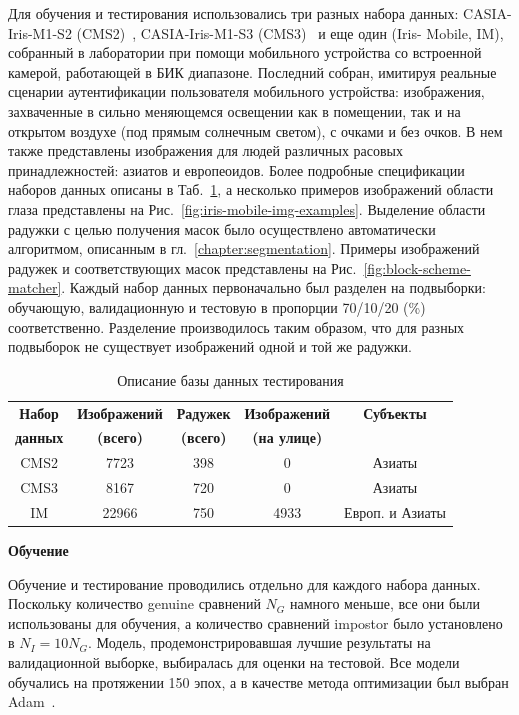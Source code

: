 Для обучения и тестирования использовались три разных набора данных: CASIA-Iris-M1-S2 (CMS2)~\cite{casia_mobile_v1}, CASIA-Iris-M1-S3 (CMS3)~\cite{casia_mobile_v1} и еще один (Iris- Mobile, IM), собранный в лаборатории при помощи мобильного устройства со встроенной камерой, работающей в БИК диапазоне. Последний собран, имитируя реальные сценарии аутентификации пользователя мобильного устройства: изображения, захваченные в сильно меняющемся освещении как в помещении, так и на открытом воздухе (под прямым солнечным светом), с очками и без очков. В нем также представлены изображения для людей различных расовых принадлежностей: азиатов и европеоидов. Более подробные спецификации наборов данных описаны в Таб.~\ref{tab:db-description-matcher}, а несколько примеров изображений области глаза представлены на Рис.~\ref{fig:iris-mobile-img-examples}. Выделение области радужки с целью получения масок было осуществлено автоматически алгоритмом, описанным в гл.~\ref{chapter:segmentation}. Примеры изображений радужек и соответствующих масок представлены на Рис.~\ref{fig:block-scheme-matcher}. Каждый набор данных первоначально был разделен на подвыборки: обучающую, валидационную и тестовую в пропорции 70/10/20 (\%) соответственно. Разделение производилось таким образом, что для разных подвыборок не существует изображений одной и той же радужки.

\begin{table}
	\begin{center}
		\begin{tabular}{|c|c|c|c|c|}
			\hline
			\textbf{Набор}	&\textbf{Изображений}	&\textbf{Радужек}	&\textbf{Изображений}	&\textbf{Субъекты}\\
			\textbf{данных}	&\textbf{(всего)}		&\textbf{(всего)}	&\textbf{(на улице)}	&\textbf{}\\
			\hline
			CMS2	&7723	&398	&0			&Азиаты\\
			CMS3	&8167	&720	&0			&Азиаты\\
			IM		&22966	&750	&4933		&Европ. и Азиаты\\
			\hline
		\end{tabular}
		\caption{Описание базы данных тестирования}
		\label{tab:db-description-matcher}
	\end{center}
\end{table}

{\bf Обучение}
\label{sec:fem-nn-training}

Обучение и тестирование проводились отдельно для каждого набора данных. Поскольку количество genuine сравнений $N_G$ намного меньше, все они были использованы для обучения, а количество сравнений impostor было установлено в $N_I=10N_G$. Модель, продемонстрировавшая лучшие результаты на валидационной выборке, выбиралась для оценки на тестовой. Все модели обучались на протяжении 150 эпох, а в качестве метода оптимизации был выбран Adam~\cite{kingma_2014}.

